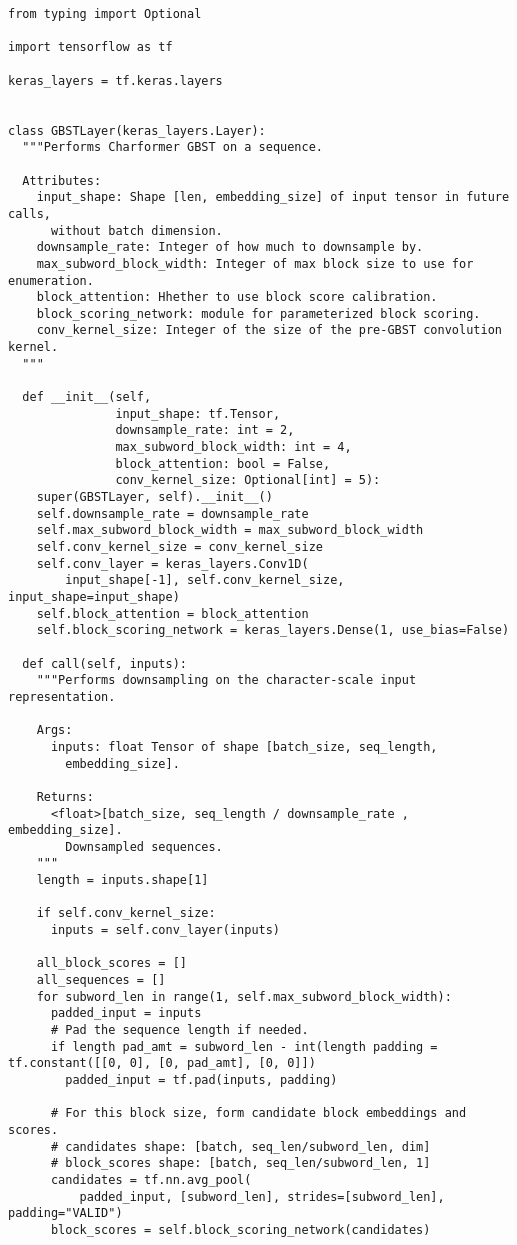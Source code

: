 \documentclass{article} \usepackage{iclr2022_conference,times}
\begin{document}
\begin{lstlisting}
from typing import Optional

import tensorflow as tf

keras_layers = tf.keras.layers


class GBSTLayer(keras_layers.Layer):
  """Performs Charformer GBST on a sequence.

  Attributes:
    input_shape: Shape [len, embedding_size] of input tensor in future calls,
      without batch dimension.
    downsample_rate: Integer of how much to downsample by.
    max_subword_block_width: Integer of max block size to use for enumeration.
    block_attention: Hhether to use block score calibration.
    block_scoring_network: module for parameterized block scoring.
    conv_kernel_size: Integer of the size of the pre-GBST convolution kernel.
  """

  def __init__(self,
               input_shape: tf.Tensor,
               downsample_rate: int = 2,
               max_subword_block_width: int = 4,
               block_attention: bool = False,
               conv_kernel_size: Optional[int] = 5):
    super(GBSTLayer, self).__init__()
    self.downsample_rate = downsample_rate
    self.max_subword_block_width = max_subword_block_width
    self.conv_kernel_size = conv_kernel_size
    self.conv_layer = keras_layers.Conv1D(
        input_shape[-1], self.conv_kernel_size, input_shape=input_shape)
    self.block_attention = block_attention
    self.block_scoring_network = keras_layers.Dense(1, use_bias=False)

  def call(self, inputs):
    """Performs downsampling on the character-scale input representation.

    Args:
      inputs: float Tensor of shape [batch_size, seq_length,
        embedding_size].

    Returns:
      <float>[batch_size, seq_length / downsample_rate , embedding_size].
        Downsampled sequences.
    """
    length = inputs.shape[1]

    if self.conv_kernel_size:
      inputs = self.conv_layer(inputs)

    all_block_scores = []
    all_sequences = []
    for subword_len in range(1, self.max_subword_block_width):
      padded_input = inputs
      # Pad the sequence length if needed.
      if length pad_amt = subword_len - int(length padding = tf.constant([[0, 0], [0, pad_amt], [0, 0]])
        padded_input = tf.pad(inputs, padding)

      # For this block size, form candidate block embeddings and scores.
      # candidates shape: [batch, seq_len/subword_len, dim]
      # block_scores shape: [batch, seq_len/subword_len, 1]
      candidates = tf.nn.avg_pool(
          padded_input, [subword_len], strides=[subword_len], padding="VALID")
      block_scores = self.block_scoring_network(candidates)


\end{lstlisting}
\end{document}
